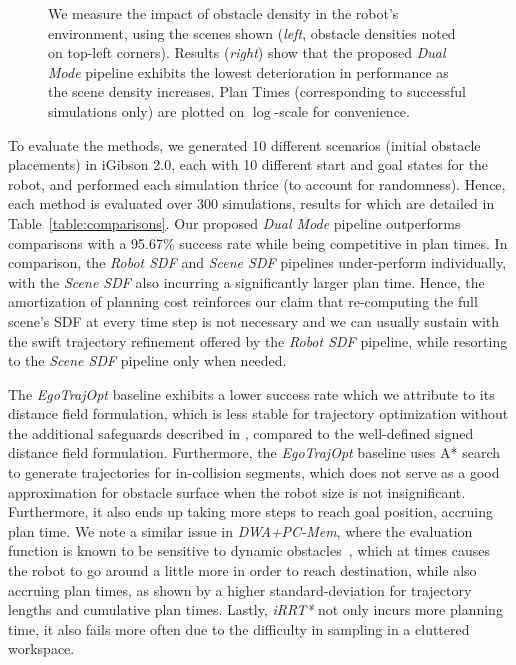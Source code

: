 \documentclass[letterpaper, 10 pt, conference]{ieeeconf}  %
\begin{document}
\begin{figure*}[!h]
    \centering
    \caption{\label{fig:sclb}
        We measure the impact of obstacle density in the robot's environment, using the scenes shown (\textit{left}, obstacle densities noted on top-left corners).
        Results (\textit{right}) show that the proposed \emph{Dual Mode} pipeline exhibits the lowest deterioration in performance as the scene density increases.
        Plan Times (corresponding to successful simulations only) are plotted on $\log$-scale for convenience.
    }
    \vspace{-4mm}
\end{figure*}

To evaluate the methods, we generated 10 different scenarios (initial obstacle placements) in iGibson 2.0, each with 10 different start and goal states for the robot, and performed each simulation thrice (to account for randomness).
Hence, each method is evaluated over 300 simulations, results for which are detailed in Table~\ref{table:comparisons}.
Our proposed \emph{Dual Mode} pipeline outperforms comparisons with a 95.67\% success rate while being competitive in plan times.
In comparison, the \emph{Robot SDF} and \emph{Scene SDF} pipelines under-perform individually, with the \emph{Scene SDF} also incurring a significantly larger plan time.
Hence, the amortization of planning cost reinforces our claim that re-computing the full scene's SDF at every time step is not necessary and we can usually sustain with the swift trajectory refinement offered by the \emph{Robot SDF} pipeline, while resorting to the \emph{Scene SDF} pipeline only when needed.

The \emph{EgoTrajOpt} baseline exhibits a lower success rate which we attribute to its distance field formulation, which is less stable for trajectory optimization without the additional safeguards described in \cite{zhou2020ego}, compared to the well-defined signed distance field formulation.
Furthermore, the \emph{EgoTrajOpt} baseline uses A* search to generate trajectories for in-collision segments, which does not serve as a good approximation for obstacle surface when the robot size is not insignificant.
Furthermore, it also ends up taking more steps to reach goal position, accruing plan time.
We note a similar issue in \emph{DWA+PC-Mem}, where the evaluation function is known to be sensitive to dynamic obstacles~\cite{dwa_impr_2024}, which at times causes the robot to go around a little more in order to reach destination, while also accruing plan times, as shown by a higher standard-deviation for trajectory lengths and cumulative plan times.
Lastly, \emph{iRRT*} not only incurs more planning time, it also fails more often due to the difficulty in sampling in a cluttered workspace.
\end{document}
